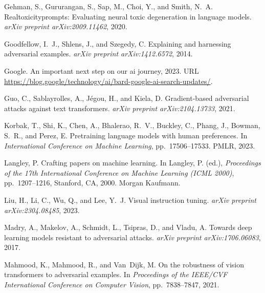 \begin{thebibliography}{39}
Gehman, S., Gururangan, S., Sap, M., Choi, Y., and Smith, N.~A.
\newblock Realtoxicityprompts: Evaluating neural toxic degeneration in language models.
\newblock \emph{arXiv preprint arXiv:2009.11462}, 2020.

Goodfellow, I.~J., Shlens, J., and Szegedy, C.
\newblock Explaining and harnessing adversarial examples.
\newblock \emph{arXiv preprint arXiv:1412.6572}, 2014.

Google.
\newblock An important next step on our ai journey, 2023.
\newblock URL \url{https://blog.google/technology/ai/bard-google-ai-search-updates/}.

Guo, C., Sablayrolles, A., J{\'e}gou, H., and Kiela, D.
\newblock Gradient-based adversarial attacks against text transformers.
\newblock \emph{arXiv preprint arXiv:2104.13733}, 2021.

Korbak, T., Shi, K., Chen, A., Bhalerao, R.~V., Buckley, C., Phang, J., Bowman, S.~R., and Perez, E.
\newblock Pretraining language models with human preferences.
\newblock In \emph{International Conference on Machine Learning}, pp.\  17506--17533. PMLR, 2023.

Langley, P.
\newblock Crafting papers on machine learning.
\newblock In Langley, P. (ed.), \emph{Proceedings of the 17th International Conference on Machine Learning (ICML 2000)}, pp.\  1207--1216, Stanford, CA, 2000. Morgan Kaufmann.

Liu, H., Li, C., Wu, Q., and Lee, Y.~J.
\newblock Visual instruction tuning.
\newblock \emph{arXiv preprint arXiv:2304.08485}, 2023.

Madry, A., Makelov, A., Schmidt, L., Tsipras, D., and Vladu, A.
\newblock Towards deep learning models resistant to adversarial attacks.
\newblock \emph{arXiv preprint arXiv:1706.06083}, 2017.

Mahmood, K., Mahmood, R., and Van~Dijk, M.
\newblock On the robustness of vision transformers to adversarial examples.
\newblock In \emph{Proceedings of the IEEE/CVF International Conference on Computer Vision}, pp.\  7838--7847, 2021.


\end{thebibliography}
